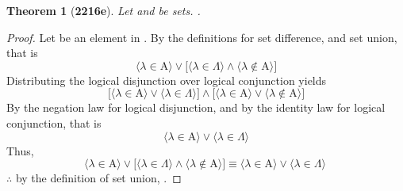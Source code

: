 \documentclass[preview]{standalone}
\newtheorem*{theorem*}{Theorem}
\begin{document}
\begin{theorem*}[\textbf{2216e}] \color{black}
    Let  and \bm{$\Lambda$} be sets. 
    .
\end{theorem*}
\begin{proof} \color{black}
    Let \bm{$\lambda$} be an element in 
    . 
    By the definitions for set difference, and set union, that is
    \begin{equation*}
        \Big \langle \lambda \in \mathrm{A} \Big \rangle 
            \lor 
        \bigg[
            \Big \langle \lambda \in \Lambda \Big \rangle 
                \land 
            \Big \langle \lambda \notin \mathrm{A} \Big \rangle 
        \bigg] 
    \end{equation*}
    Distributing the logical disjunction over logical conjunction yields
    \begin{equation*}
        \bigg[
            \Big \langle \lambda \in \mathrm{A} \Big \rangle 
                \lor 
            \Big \langle \lambda \in \Lambda \Big \rangle
        \bigg]
            \land
        \bigg[
            \Big \langle \lambda \in \mathrm{A} \Big \rangle
                \lor
            \Big \langle \lambda \notin \mathrm{A} \Big \rangle 
        \bigg]
    \end{equation*} 
    By the negation law for logical disjunction, 
    and by the identity law for logical conjunction, that is
    \begin{equation*}
        \Big \langle \lambda \in \mathrm{A} \Big \rangle 
        \lor 
        \Big \langle \lambda \in \Lambda \Big \rangle
    \end{equation*}
    Thus, 
    \begin{equation*}
        \Big \langle \lambda \in \mathrm{A} \Big \rangle 
            \lor 
        \bigg[
            \Big \langle \lambda \in \Lambda \Big \rangle 
                \land 
            \Big \langle \lambda \notin \mathrm{A} \Big \rangle 
        \bigg]
        \equiv
        \Big \langle \lambda \in \mathrm{A} \Big \rangle 
            \lor 
        \Big \langle \lambda \in \Lambda \Big \rangle\
    \end{equation*}
    $\therefore$ by the definition of set union,
    .
\color{lightgray} \end{proof}
\end{document}
